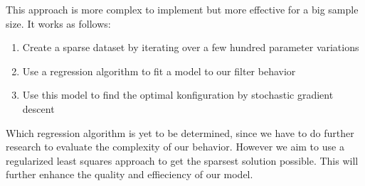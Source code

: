 \documentclass[titlepage, a4paper, 11pt]{scrartcl}
\begin{document}
This approach is more complex to implement but more effective for a big sample size. It works as follows:

\begin{enumerate}
    \item Create a sparse dataset by iterating over a few hundred parameter variations
    \item Use a regression algorithm to fit a model to our filter behavior
    \item Use this model to find the optimal konfiguration by stochastic gradient descent
\end{enumerate}

Which regression algorithm is yet to be determined, since we have to do further research to evaluate
the complexity of our behavior. However we aim to use a regularized least squares approach to get the sparsest solution possible.
This will further enhance the quality and effieciency of our model.

% 
%
\end{document}
